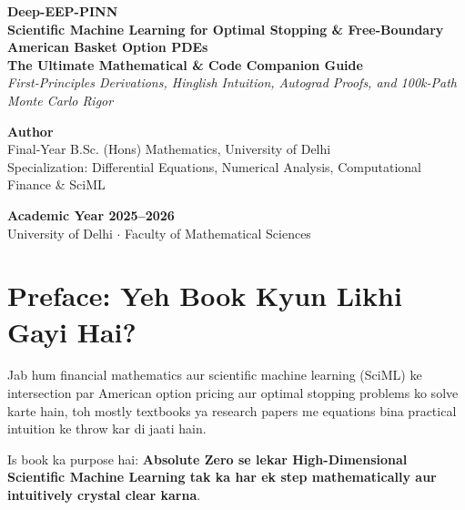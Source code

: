 \documentclass[11pt,a4paper,oneside]{book}
\begin{document}
\begin{titlepage}
    \centering
    \vspace*{1.5cm}
    {\Huge \textbf{Deep-EEP-PINN}}\\[0.6em]
    {\LARGE \textbf{Scientific Machine Learning for Optimal Stopping \& Free-Boundary American Basket Option PDEs}}\\[1.5em]
    
    {\Large \textbf{The Ultimate Mathematical \& Code Companion Guide}}\\[0.8em]
    {\large \textit{First-Principles Derivations, Hinglish Intuition, Autograd Proofs, and 100k-Path Monte Carlo Rigor}}
    
    \vspace{2.5cm}
    \textbf{\Large Author}\\[0.5em]
    {\large Final-Year B.Sc. (Hons) Mathematics, University of Delhi}\\[0.3em]
    {\normalsize Specialization: Differential Equations, Numerical Analysis, Computational Finance \& SciML}
    
    \vfill
    {\large \textbf{Academic Year 2025--2026}}\\[0.3em]
    {\normalsize University of Delhi $\cdot$ Faculty of Mathematical Sciences}
\end{titlepage}

\tableofcontents
\newpage

\chapter*{Preface: Yeh Book Kyun Likhi Gayi Hai?}

Jab hum financial mathematics aur scientific machine learning (SciML) ke intersection par American option pricing aur optimal stopping problems ko solve karte hain, toh mostly textbooks ya research papers me equations bina practical intuition ke throw kar di jaati hain. 

Is book ka purpose hai: \textbf{Absolute Zero se lekar High-Dimensional Scientific Machine Learning tak ka har ek step mathematically aur intuitively crystal clear karna}.
\end{document}

